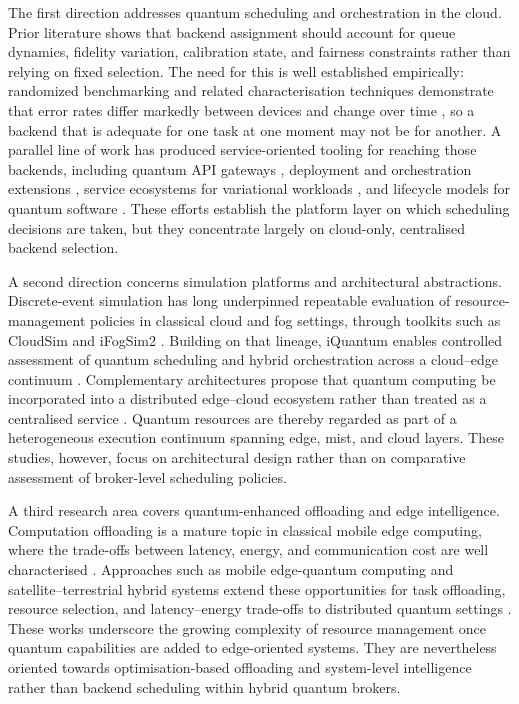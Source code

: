 \documentclass[preprint,12pt]{elsarticle}
\begin{document}
The first direction addresses quantum scheduling and orchestration in the cloud.
Prior literature shows that backend assignment should account for queue
dynamics, fidelity variation, calibration state, and fairness constraints rather
than relying on fixed selection. The need for this is well established
empirically: randomized benchmarking and related characterisation techniques
demonstrate that error rates differ markedly between devices and change over
time \cite{magesan2011, magesan2012, proctor2025}, so a backend that is
adequate for one task at one moment may not be for another. A parallel line of
work has produced service-oriented tooling for reaching those backends,
including quantum API gateways \cite{garcia2022}, deployment and orchestration
extensions \cite{wild2021}, service ecosystems for variational workloads
\cite{beisel2023}, and lifecycle models for quantum software
\cite{weder2021a, weder2021b}. These efforts establish the platform layer on
which scheduling decisions are taken, but they concentrate largely on
cloud-only, centralised backend selection.

A second direction concerns simulation platforms and architectural
abstractions. Discrete-event simulation has long underpinned repeatable
evaluation of resource-management policies in classical cloud and fog settings,
through toolkits such as CloudSim \cite{calheiros2011} and iFogSim2
\cite{mahmud2022}. Building on that lineage, iQuantum enables controlled
assessment of quantum scheduling and hybrid orchestration across a cloud--edge
continuum \cite{nguyen2024}. Complementary architectures propose that quantum
computing be incorporated into a distributed edge--cloud ecosystem rather than
treated as a centralised service \cite{furutanpey2023, mastroianni2023}. Quantum
resources are
thereby regarded as part of a heterogeneous execution continuum spanning edge,
mist, and cloud layers. These studies, however, focus on architectural design
rather than on comparative assessment of broker-level scheduling policies.

A third research area covers quantum-enhanced offloading and edge intelligence.
Computation offloading is a mature topic in classical mobile edge computing,
where the trade-offs between latency, energy, and communication cost are well
characterised \cite{mao2017, abbas2018}. Approaches such as mobile edge-quantum
computing and satellite--terrestrial hybrid systems extend these opportunities
for task offloading, resource selection, and latency--energy trade-offs to
distributed quantum settings \cite{xu2025, huang2024}.
These works underscore the growing complexity of resource management once
quantum capabilities are added to edge-oriented systems. They are nevertheless
oriented towards optimisation-based offloading and system-level intelligence
rather than backend scheduling within hybrid quantum brokers.
\end{document}

